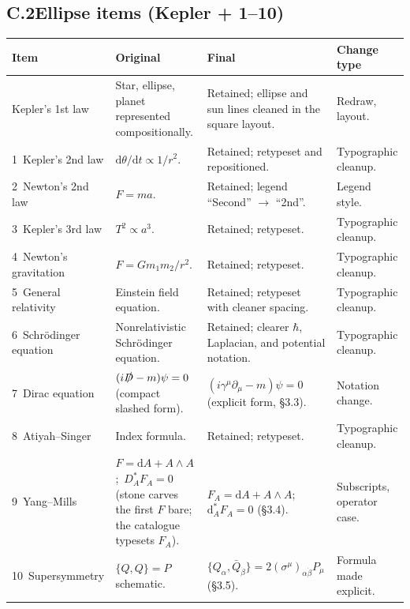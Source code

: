 \documentclass[10pt]{article}
\begin{document}
\subsection*{C.2\quad Ellipse items (Kepler + 1--10)}
\begin{longtable}{@{}L{2.55cm} L{4.6cm} L{5.5cm} L{2.9cm}@{}}
\toprule
\textbf{Item} & \textbf{Original} & \textbf{Final} & \textbf{Change type}\\
\midrule
\endhead
Kepler's 1st law & Star, ellipse, planet represented compositionally. &
  Retained; ellipse and sun lines cleaned in the square layout. &
  Redraw, layout.\\
1~Kepler's 2nd law & $\mathrm{d}\theta/\mathrm{d}t \propto 1/r^2$. &
  Retained; retypeset and repositioned. & Typographic cleanup.\\
2~Newton's 2nd law & $F = ma$. & Retained; legend ``Second''
  $\rightarrow$ ``2nd''. & Legend style.\\
3~Kepler's 3rd law & $T^2 \propto a^3$. & Retained; retypeset. &
  Typographic cleanup.\\
4~Newton's gravitation & $F = G m_1 m_2 / r^2$. & Retained; retypeset.
  & Typographic cleanup.\\
5~General relativity & Einstein field equation. & Retained; retypeset
  with cleaner spacing. & Typographic cleanup.\\
6~Schr\"odinger equation & Nonrelativistic Schr\"odinger equation. &
  Retained; clearer $\hbar$, Laplacian, and potential notation. &
  Typographic cleanup.\\
7~Dirac equation & $(i\slashed{D} - m)\psi = 0$ (compact slashed
  form). & $(i\gamma^\mu \partial_\mu - m)\psi = 0$ (explicit form,
  \S3.3). & Notation change.\\
8~Atiyah--Singer & Index formula. & Retained; retypeset. & Typographic
  cleanup.\\
9~Yang--Mills & $F = \mathrm{d}A + A\wedge A$;\ $D_A^{*} F_A = 0$
  (stone carves the first $F$ bare; the catalogue typesets $F_A$). &
  $F_A = \mathrm{d}A + A\wedge A$;\ $\mathrm{d}_A^{*} F_A = 0$
  (\S3.4). & Subscripts, operator case.\\
10~Supersymmetry & $\{Q, Q\} = P$ schematic. &
  $\{Q_\alpha, \bar{Q}_{\dot{\beta}}\} =
  2(\sigma^\mu)_{\alpha\dot{\beta}} P_\mu$ (\S3.5). & Formula made
  explicit.\\
\bottomrule
\end{longtable}
\end{document}
